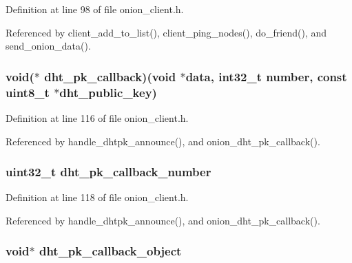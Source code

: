 Definition at line 98 of file onion\+\_\+client.\+h.



Referenced by client\+\_\+add\+\_\+to\+\_\+list(), client\+\_\+ping\+\_\+nodes(), do\+\_\+friend(), and send\+\_\+onion\+\_\+data().

\hypertarget{struct_onion___friend_ab0f780a41ece58bf84d8460e71cbdbb3}{
\subsubsection[{dht\+\_\+pk\+\_\+callback}]{\setlength{\rightskip}{0pt plus 5cm}void($\ast$ dht\+\_\+pk\+\_\+callback)(void $\ast$data, int32\+\_\+t number, const uint8\+\_\+t $\ast${\bf dht\+\_\+public\+\_\+key})}}\label{struct_onion___friend_ab0f780a41ece58bf84d8460e71cbdbb3}


Definition at line 116 of file onion\+\_\+client.\+h.



Referenced by handle\+\_\+dhtpk\+\_\+announce(), and onion\+\_\+dht\+\_\+pk\+\_\+callback().

\hypertarget{struct_onion___friend_ab0413da421baacf312141b8ae3ec7762}{
\subsubsection[{dht\+\_\+pk\+\_\+callback\+\_\+number}]{\setlength{\rightskip}{0pt plus 5cm}uint32\+\_\+t dht\+\_\+pk\+\_\+callback\+\_\+number}}\label{struct_onion___friend_ab0413da421baacf312141b8ae3ec7762}


Definition at line 118 of file onion\+\_\+client.\+h.



Referenced by handle\+\_\+dhtpk\+\_\+announce(), and onion\+\_\+dht\+\_\+pk\+\_\+callback().

\hypertarget{struct_onion___friend_ab5d618d73b8d83fb07209433e7b448ee}{
\subsubsection[{dht\+\_\+pk\+\_\+callback\+\_\+object}]{\setlength{\rightskip}{0pt plus 5cm}void$\ast$ dht\+\_\+pk\+\_\+callback\+\_\+object}}\label{struct_onion___friend_ab5d618d73b8d83fb07209433e7b448ee}


